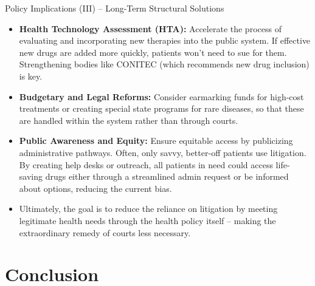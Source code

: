 \documentclass{beamer}
\begin{document}
\begin{frame}{Policy Implications (III) – Long-Term Structural Solutions}
\begin{itemize}
  \item \textbf{Health Technology Assessment (HTA):} Accelerate the process of evaluating and incorporating new therapies into the public system. If effective new drugs are added more quickly, patients won’t need to sue for them. Strengthening bodies like CONITEC (which recommends new drug inclusion) is key.
  \item \textbf{Budgetary and Legal Reforms:} Consider earmarking funds for high-cost treatments or creating special state programs for rare diseases, so that these are handled within the system rather than through courts.
  \item \textbf{Public Awareness and Equity:} Ensure equitable access by publicizing administrative pathways. Often, only savvy, better-off patients use litigation. By creating help desks or outreach, all patients in need could access life-saving drugs either through a streamlined admin request or be informed about options, reducing the current bias.
  \item Ultimately, the goal is to reduce the reliance on litigation by meeting legitimate health needs through the health policy itself – making the extraordinary remedy of courts less necessary.
\end{itemize}
\end{frame}

\section{Conclusion}
\end{document}
